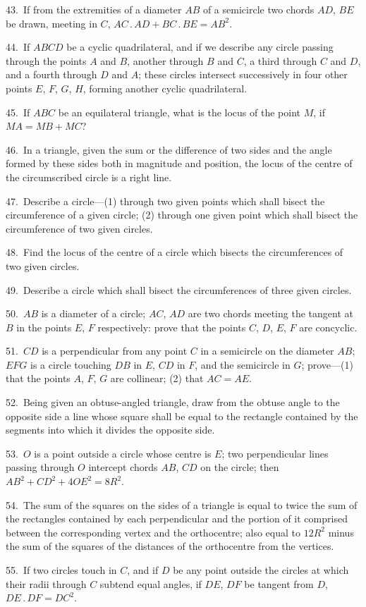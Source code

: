\documentclass[oneside]{book}
\begin{document}
\begin{footnotesize}
43.~If from the extremities of a diameter $AB$ of a semicircle
two chords $AD$, $BE$ be drawn, meeting in $C$, $AC\,.\,AD + BC\,.\,BE
= AB^{2}$.

44.~If $ABCD$ be a cyclic quadrilateral, and if we describe any
circle passing through the points $A$ and $B$, another through $B$
and $C$, a third through $C$ and $D$, and a fourth through $D$ and $A$;
these circles intersect\label{circlesin} 
successively in four other points $E$, $F$, $G$, $H$,
forming another cyclic quadrilateral.

45.~If $ABC$ be an equilateral triangle, what is the locus of the
point $M$, if $MA = MB + MC$?

46.~In a triangle, given the sum or the difference of two sides
and the angle formed by these sides both in magnitude and position,
the locus of the centre of the circumscribed circle is a right line.

47.~Describe a circle---(1) through two given points which
shall bisect the circumference of a given circle; (2) through
one given point which shall bisect the circumference of two
given circles.

48.~Find the locus of the centre of a circle which bisects the
circumferences of two given circles.

49.~Describe a circle which shall bisect the circumferences of
three given circles.

50.~$AB$ is a diameter of a circle; $AC$, $AD$ are two chords meeting
the tangent at $B$ in the points $E$, $F$ respectively: prove that
the points $C$, $D$, $E$, $F$ are concyclic.

51.~$CD$ is a perpendicular from any point $C$ in a semicircle on
the diameter $AB$; $EFG$ is a circle touching $DB$ in $E$, $CD$ in $F$,
and the semicircle in $G$; prove---(1) that the points $A$, $F$, $G$ are
collinear; (2) that $AC = AE$.

52.~Being given an obtuse-angled triangle, draw from the
obtuse angle to the opposite side a line whose square shall be
equal to the rectangle contained by the segments into which it
divides the opposite side.

53.~$O$ is a point outside a circle whose centre is $E$; two perpendicular
lines passing through $O$ intercept chords $AB$, $CD$ on
the circle; then $AB^{2} + CD^{2} + 4OE^{2} = 8R^{2}$.

54.~The sum of the squares on the sides of a triangle is equal
to twice the sum of the rectangles contained by each perpendicular
and the portion of it comprised between the corresponding vertex
and the orthocentre; also equal to $12R^{2}$ minus the sum of the
squares of the distances of the orthocentre from the vertices.

55.~If two circles touch in $C$, and if $D$ be any point outside the
circles at which their radii through $C$ subtend equal angles, if
$DE$, $DF$ be tangent from $D$, $DE\,.\,DF=DC^{2}$.
\end{footnotesize}
\end{document}
